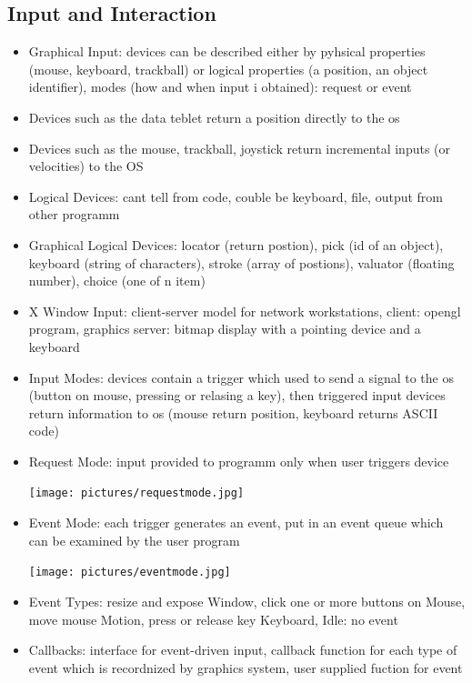 \documentclass[11pt,a4paper]{article}
\begin{document}
	\subsection{Input and Interaction}
	\begin{itemize}
		\item Graphical Input: devices can be described either by pyhsical properties (mouse, keyboard, trackball) or logical properties (a position, an object identifier), modes (how and when input i obtained): request or event
		\item Devices such as the data teblet return a position directly to the os
		\item Devices such as the mouse, trackball, joystick return incremental inputs (or velocities) to the OS
		\item Logical Devices: cant tell from code, couble be keyboard, file, output from other programm
		\item Graphical Logical Devices: locator (return postion), pick (id of an object), keyboard (string of characters), stroke (array of postions), valuator (floating number), choice (one of n item)
		\item X Window Input: client-server model for network workstations, client: opengl program, graphics server: bitmap display with a pointing device and a keyboard
		\item Input Modes: devices contain a trigger which used to send a signal to the os (button on mouse, pressing or relasing a key), then triggered input devices return information to os (mouse return position, keyboard returns ASCII code)
		\item Request Mode: input provided to programm only when user triggers device 
		\begin{center}
			\texttt{[image: pictures/requestmode.jpg]}
		\end{center}
		\item Event Mode: each trigger generates an event, put in an event queue which can be examined by the user program
		\begin{center}
			\texttt{[image: pictures/eventmode.jpg]}
		\end{center}
		\item Event Types: resize and expose Window, click one or more buttons on Mouse, move mouse Motion, press or release key Keyboard, Idle: no event
		\item Callbacks: interface for event-driven input, callback function for each type of event which is recordnized by graphics system, user supplied fuction for event

\end{itemize}
\end{document}
